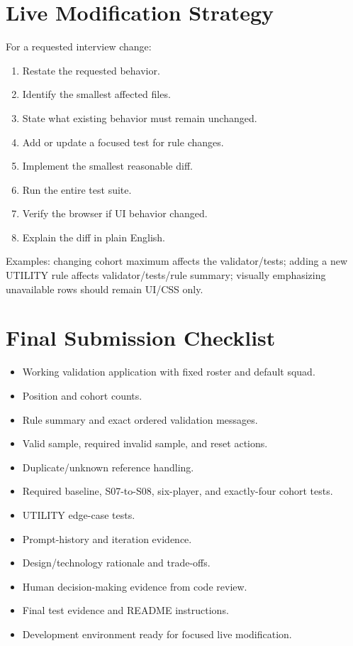\documentclass[11pt,a4paper]{article}
\begin{document}
\section{Live Modification Strategy}
For a requested interview change:
\begin{enumerate}
\item Restate the requested behavior.
\item Identify the smallest affected files.
\item State what existing behavior must remain unchanged.
\item Add or update a focused test for rule changes.
\item Implement the smallest reasonable diff.
\item Run the entire test suite.
\item Verify the browser if UI behavior changed.
\item Explain the diff in plain English.
\end{enumerate}
Examples: changing cohort maximum affects the validator/tests; adding a new UTILITY rule affects validator/tests/rule summary; visually emphasizing unavailable rows should remain UI/CSS only.

\section{Final Submission Checklist}
\begin{itemize}
\item[$\checkmark$] Working validation application with fixed roster and default squad.
\item[$\checkmark$] Position and cohort counts.
\item[$\checkmark$] Rule summary and exact ordered validation messages.
\item[$\checkmark$] Valid sample, required invalid sample, and reset actions.
\item[$\checkmark$] Duplicate/unknown reference handling.
\item[$\checkmark$] Required baseline, S07-to-S08, six-player, and exactly-four cohort tests.
\item[$\checkmark$] UTILITY edge-case tests.
\item[$\checkmark$] Prompt-history and iteration evidence.
\item[$\checkmark$] Design/technology rationale and trade-offs.
\item[$\checkmark$] Human decision-making evidence from code review.
\item[$\checkmark$] Final test evidence and README instructions.
\item[$\checkmark$] Development environment ready for focused live modification.
\end{itemize}
\end{document}
